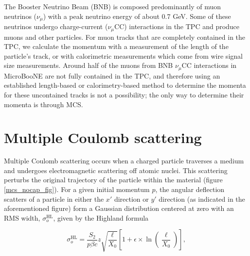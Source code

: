 \documentclass[a4paper,11pt]{article}
\begin{document}
The Booster Neutrino Beam (BNB) is composed predominantly of muon neutrinos ($\nu_\mu$) with a peak neutrino energy of about 0.7 GeV. Some of these neutrinos undergo charge-current ($\nu_\mu$CC) interactions in the TPC and produce muons and other particles. For muon tracks that are completely contained in the TPC, we calculate the momentum with a measurement of the length of the particle's track, or with calorimetric measurements which come from wire signal size measurements. Around half of the muons from BNB $\nu_\mu$CC interactions in MicroBooNE are not fully contained in the TPC, and therefore using an established length-based or calorimetry-based method to determine the momenta for these uncontained tracks is not a possibility; the only way to determine their momenta is through MCS. \\

\section{Multiple Coulomb scattering}

Multiple Coulomb scattering occurs when a charged particle traverses a medium and undergoes electromagnetic scattering off atomic nuclei. This scattering perturbs the original trajectory of the particle within the material (figure \ref{mcs_nocap_fig}). For a given initial momentum $p$, the angular deflection scatters of a particle in either the $x'$ direction or $y'$ direction (as indicated in the aforementioned figure) form a Gaussian distribution centered at zero with an RMS width, $\sigma_o^{\text{HL}}$, given by the Highland formula \cite{highland}\cite{highland-lynch-dahl} 

\begin{equation}\label{highland_eqtn}
	\sigma_o^{\text{HL}}=\frac{S_2}{p\beta c}z\sqrt{\frac{\ell}{X_0}}\left[1+\epsilon\times\ln\left(\frac{\ell}{X_0}\right)\right],
\end{equation}
\end{document}
